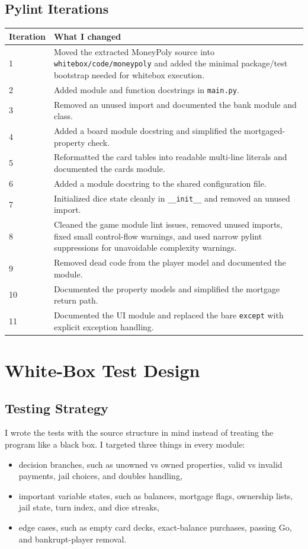 \documentclass[12pt]{article}
\begin{document}
\subsection{Pylint Iterations}
\begin{longtable}{p{}p{}}
\toprule
\textbf{Iteration} & \textbf{What I changed} \\
\midrule
\endhead
1 & Moved the extracted MoneyPoly source into \texttt{whitebox/code/moneypoly} and added the minimal package/test bootstrap needed for whitebox execution. \\
2 & Added module and function docstrings in \texttt{main.py}. \\
3 & Removed an unused import and documented the bank module and class. \\
4 & Added a board module docstring and simplified the mortgaged-property check. \\
5 & Reformatted the card tables into readable multi-line literals and documented the cards module. \\
6 & Added a module docstring to the shared configuration file. \\
7 & Initialized dice state cleanly in \texttt{\_\_init\_\_} and removed an unused import. \\
8 & Cleaned the game module lint issues, removed unused imports, fixed small control-flow warnings, and used narrow pylint suppressions for unavoidable complexity warnings. \\
9 & Removed dead code from the player model and documented the module. \\
10 & Documented the property models and simplified the mortgage return path. \\
11 & Documented the UI module and replaced the bare \texttt{except} with explicit exception handling. \\
\bottomrule
\end{longtable}

\section{White-Box Test Design}
\subsection{Testing Strategy}
I wrote the tests with the source structure in mind instead of treating the program like a black box. I targeted three things in every module:

\begin{itemize}
  \item decision branches, such as unowned vs owned properties, valid vs invalid payments, jail choices, and doubles handling,
  \item important variable states, such as balances, mortgage flags, ownership lists, jail state, turn index, and dice streaks,
  \item edge cases, such as empty card decks, exact-balance purchases, passing Go, and bankrupt-player removal.
\end{itemize}
\end{document}
